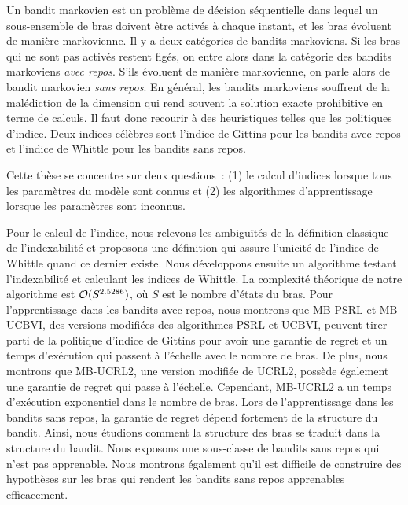 Un bandit markovien est un problème de décision séquentielle dans lequel un sous-ensemble de bras doivent être activés à chaque instant, et les bras évoluent de manière markovienne.
Il y a deux catégories de bandits markoviens. 
Si les bras qui ne sont pas activés restent figés, on entre alors dans la catégorie des bandits markoviens \emph{avec repos}.
S'ils évoluent de manière markovienne, on parle alors de bandit markovien \emph{sans repos}.
En général, les bandits markoviens souffrent de la malédiction de la dimension qui rend souvent la solution exacte prohibitive en terme de calculs.
Il faut donc recourir à des heuristiques telles que les politiques d'indice.
Deux indices célèbres sont l'indice de Gittins pour les bandits avec repos et l'indice de Whittle pour les bandits sans repos.

Cette thèse se concentre sur deux questions : (1) le calcul d'indices lorsque tous les paramètres du modèle sont connus et (2) les algorithmes d'apprentissage lorsque les paramètres sont inconnus.

Pour le calcul de l'indice, nous relevons les ambiguïtés de la définition classique de l'indexabilité et proposons une définition qui assure l'unicité de l'indice de Whittle quand ce dernier existe.
Nous développons ensuite un algorithme testant l'indexabilité et calculant les indices de Whittle.
La complexité théorique de notre algorithme est $\mathcal{O}(S^{2.5286})$, où $S$ est le nombre d'états du bras.
Pour l'apprentissage dans les bandits avec repos, nous montrons que MB-PSRL et MB-UCBVI, des versions modifiées des algorithmes PSRL et UCBVI, peuvent tirer parti de la politique d'indice de Gittins pour avoir une garantie de regret et un temps d'exécution qui passent à l'échelle avec le nombre de bras.
De plus, nous montrons que MB-UCRL2, une version modifiée de UCRL2, possède également une garantie de regret qui passe à l'échelle.
Cependant, MB-UCRL2 a un temps d'exécution exponentiel dans le nombre de bras.
Lors de l'apprentissage dans les bandits sans repos, la garantie de regret dépend fortement de la structure du bandit. Ainsi, nous étudions comment la structure des bras se traduit dans la structure du bandit.
Nous exposons une sous-classe de bandits sans repos qui n'est pas apprenable.
Nous montrons également qu'il est difficile de construire des hypothèses sur les bras qui rendent les bandits sans repos apprenables efficacement.
